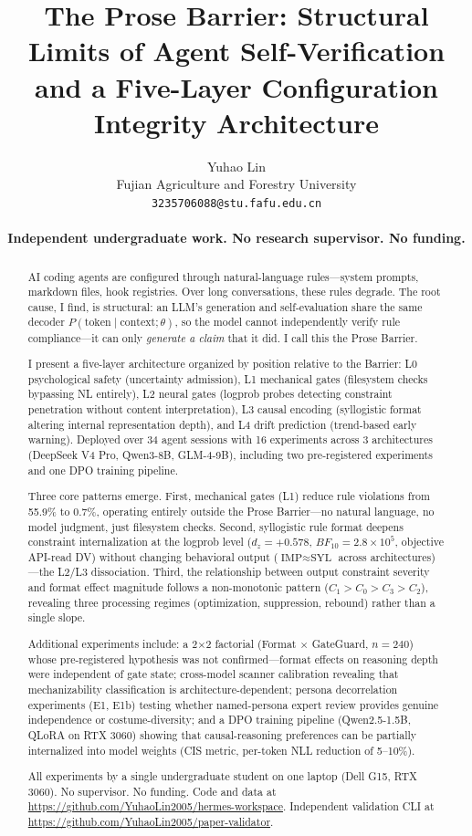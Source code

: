 \documentclass[11pt]{article}
\title{The Prose Barrier: Structural Limits of Agent Self-Verification \\
  and a Five-Layer Configuration Integrity Architecture}
\author{Yuhao Lin \\
  Fujian Agriculture and Forestry University \\
  \texttt{3235706088@stu.fafu.edu.cn} \\\\
  \textbf{Independent undergraduate work. No research supervisor. No funding.}}
\begin{document}
\maketitle

\begin{abstract}
AI coding agents are configured through natural-language rules---system prompts,
markdown files, hook registries. Over long conversations, these rules degrade.
The root cause, I find, is structural: an LLM's generation and self-evaluation
share the same decoder $P(\text{token} \mid \text{context}; \theta)$, so the
model cannot independently verify rule compliance---it can only \textit{generate
a claim} that it did. I call this the Prose Barrier.

I present a five-layer architecture organized by position relative to the
Barrier: L0 psychological safety (uncertainty admission), L1 mechanical gates
(filesystem checks bypassing NL entirely), L2 neural gates (logprob probes
detecting constraint penetration without content interpretation), L3 causal
encoding (syllogistic format altering internal representation depth), and L4
drift prediction (trend-based early warning). Deployed over 34 agent sessions
with 16 experiments across 3 architectures (DeepSeek V4 Pro, Qwen3-8B, GLM-4-9B),
including two pre-registered experiments and one DPO training pipeline.

Three core patterns emerge. First, mechanical gates (L1) reduce rule violations
from 55.9\% to 0.7\%, operating entirely outside the Prose Barrier---no natural
language, no model judgment, just filesystem checks. Second, syllogistic rule
format deepens constraint internalization at the logprob level ($d_z{=}+0.578$,
$BF_{10}{=}2.8{\times}10^5$, objective API-read DV) without changing behavioral
output ($\text{IMP}{\approx}\text{SYL}$ across architectures)---the L2/L3
dissociation. Third, the relationship between output constraint severity and
format effect magnitude follows a non-monotonic pattern ($C_1 > C_0 > C_3 > C_2$),
revealing three processing regimes (optimization, suppression, rebound) rather
than a single slope.

Additional experiments include: a 2$\times$2 factorial (Format $\times$ GateGuard,
$n{=}240$) whose pre-registered hypothesis was not confirmed---format effects on
reasoning depth were independent of gate state; cross-model scanner calibration
revealing that mechanizability classification is architecture-dependent; persona
decorrelation experiments (E1, E1b) testing whether named-persona expert review
provides genuine independence or costume-diversity; and a DPO training pipeline
(Qwen2.5-1.5B, QLoRA on RTX 3060) showing that causal-reasoning preferences can
be partially internalized into model weights (CIS metric, per-token NLL reduction
of 5--10\%).

All experiments by a single undergraduate student on one laptop (Dell G15,
RTX 3060). No supervisor. No funding. Code and data at
\url{https://github.com/YuhaoLin2005/hermes-workspace}.
Independent validation CLI at \url{https://github.com/YuhaoLin2005/paper-validator}.
\end{abstract}
\end{document}
